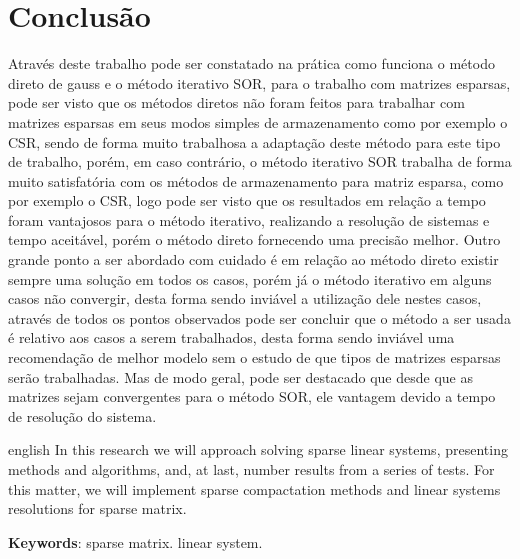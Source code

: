 \documentclass[
	article,			%
	11pt,				%
	oneside,			%
	a4paper,			%
	english,			%
	brazil,				%
	sumario=tradicional
	]{abntex2}
\begin{document}

\section*{Conclusão}
Através deste trabalho pode ser constatado na prática como funciona o método direto de gauss e o método iterativo SOR, para o trabalho com matrizes esparsas, pode ser visto que os métodos diretos não foram feitos para trabalhar com matrizes esparsas em seus modos simples de armazenamento como por exemplo o CSR, sendo de forma muito trabalhosa a adaptação deste método para este tipo de trabalho, porém, em caso contrário, o método iterativo SOR trabalha de forma muito satisfatória com os métodos de armazenamento para matriz esparsa, como por exemplo o CSR, logo pode ser visto que os resultados em relação a tempo foram vantajosos para o método iterativo, realizando a resolução de sistemas e tempo aceitável, porém o método direto fornecendo uma precisão melhor. Outro grande ponto a ser abordado com cuidado é em relação ao método direto existir sempre uma solução em todos os casos, porém já o método iterativo em alguns casos não convergir, desta forma sendo inviável a utilização dele nestes casos, através de todos os pontos observados pode ser concluir que o método a ser usada é relativo aos casos a serem trabalhados, desta forma sendo inviável uma recomendação de melhor modelo sem o estudo de que tipos de matrizes esparsas serão trabalhadas. Mas de modo geral, pode ser destacado que desde que as matrizes sejam convergentes para o método SOR, ele vantagem devido a tempo de resolução do sistema.

\postextual


\emptythanks
\maketitle

\renewcommand{\resumoname}{Abstract}
\begin{resumoumacoluna}
 \begin{otherlanguage*}{english}
   In this research we will approach solving sparse linear systems, presenting methods and algorithms, and, at last, number results from a series of tests. For this matter, we will implement sparse compactation methods and linear systems resolutions for sparse matrix.

   \vspace{\onelineskip}
 
   \noindent
   \textbf{Keywords}: sparse matrix. linear system.
 \end{otherlanguage*}  
\end{resumoumacoluna}





\end{document}

